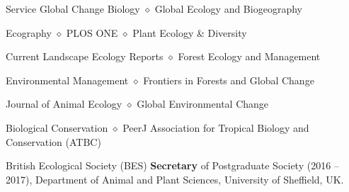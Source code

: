 
\begin{rubric}{Service}
    Global Change Biology $\diamond$ Global Ecology and Biogeography \par  Ecography $\diamond$ PLOS ONE $\diamond$ Plant Ecology \& Diversity \par Current Landscape Ecology Reports $\diamond$ Forest Ecology and Management \par Environmental Management  $\diamond$ Frontiers in Forests and Global Change \par Journal of Animal Ecology $\diamond$ Global Environmental Change \par Biological Conservation $\diamond$ PeerJ
	Association for Tropical Biology and Conservation (ATBC) 
	\par British Ecological Society (BES)
    \textbf{Secretary} of Postgraduate Society (2016 -- 2017), Department of Animal and Plant Sciences, University of Sheffield, UK.
\end{rubric}
